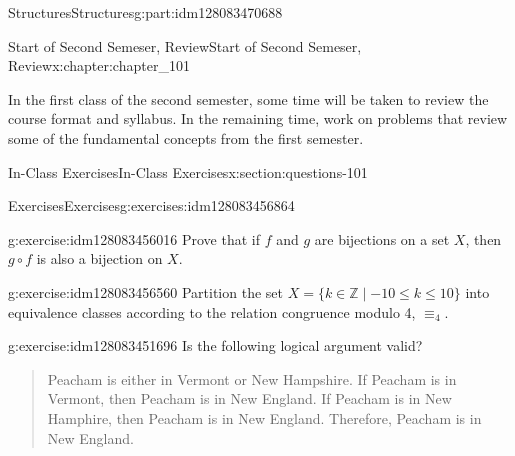 \documentclass[oneside,10pt,]{book}
\numberwithin{equation}{section}
\begin{document}
\begin{partptx}{Structures}{}{Structures}{}{}{g:part:idm128083470688}
%
\typeout{************************************************}
\typeout{************************************************}
%
\begin{chapterptx}{Start of Second Semeser, Review}{}{Start of Second Semeser, Review}{}{}{x:chapter:chapter_101}
\begin{introduction}{}%
In the first class of the second semester, some time will be taken to review the course format and syllabus.  In the remaining time, work on problems that review some of the fundamental concepts from the first semester.%
\end{introduction}%
%
%
\typeout{************************************************}
\typeout{************************************************}
%
\begin{sectionptx}{In-Class Exercises}{}{In-Class Exercises}{}{}{x:section:questions-101}
%
%
%
\typeout{************************************************}
\typeout{************************************************}
%
\begin{exercises-subsection}{Exercises}{}{Exercises}{}{}{g:exercises:idm128083456864}
\par\medskip\noindent%
%
\begin{exercisegroup}
\begin{divisionexerciseeg}{1}{}{}{g:exercise:idm128083456016}%
Prove that if \(f\) and \(g\) are bijections on a set \(X\), then \(g \circ f\) is also a bijection on \(X\).%
\end{divisionexerciseeg}%
\begin{divisionexerciseeg}{2}{}{}{g:exercise:idm128083456560}%
Partition the set \(X=\{k \in \mathbb{Z} \mid  -10 \leq k \leq 10\}\) into equivalence classes according to the relation congruence modulo 4, \(\equiv_4\).%
\end{divisionexerciseeg}%
\begin{divisionexerciseeg}{3}{}{}{g:exercise:idm128083451696}%
Is the following logical argument valid?%
\begin{quote}%
Peacham is either in Vermont or New Hampshire. If Peacham is in Vermont, then Peacham is in New England. If Peacham is in New Hamphire, then Peacham is in New England. Therefore, Peacham is in New England.%
\end{quote}
\end{divisionexerciseeg}%

\end{exercisegroup}
\end{exercises-subsection}
\end{sectionptx}
\end{chapterptx}
\end{partptx}
\end{document}
